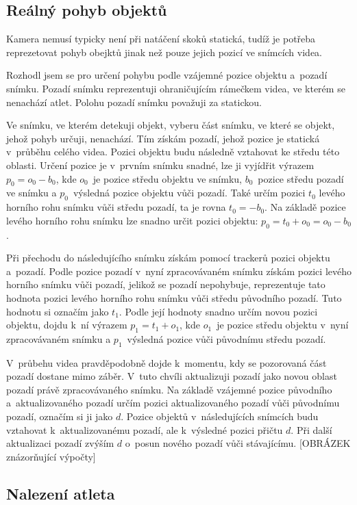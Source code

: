\subsection{Reálný pohyb objektů}

Kamera nemusí typicky není při natáčení skoků statická, tudíž je potřeba reprezetovat pohyb obejktů jinak než pouze jejich pozicí ve snímcích videa.

Rozhodl jsem se pro určení pohybu podle vzájemné pozice objektu a~pozadí snímku. Pozadí snímku reprezentuji ohraničujícím rámečkem videa, ve kterém se nenachází atlet. Polohu pozadí snímku považuji za statickou.

Ve snímku, ve kterém detekuji objekt, vyberu část snímku, ve které se objekt, jehož pohyb určuji, nenachází. Tím získám pozadí, jehož pozice je statická v~průběhu celého videa. Pozici objektu budu následně vztahovat ke středu této oblasti. Určení pozice je v~prvním snímku snadné, lze ji vyjídřit výrazem $p_0=o_0-b_0$, kde $o_0$~je pozice středu objektu ve snímku, $b_0$~pozice středu pozadí ve snímku a $p_0$~výsledná pozice objektu vůči pozadí. Také určím pozici $t_0$ levého horního rohu snímku vůči středu pozadí, ta je rovna $t_0=-b_0$. Na základě pozice levého horního rohu snímku lze snadno určit pozici objektu: $p_0=t_0+o_0=o_0-b_0$.

Při přechodu do následujícího snímku získám pomocí trackerů pozici objektu a~pozadí. Podle pozice pozadí v~nyní zpracovávaném snímku získám pozici levého horního snímku vůči pozadí, jelikož se pozadí nepohybuje, reprezentuje tato hodnota pozici levého horního rohu snímku vůči středu původního pozadí. Tuto hodnotu si označím jako $t_1$. Podle její hodnoty snadno určím novou pozici objektu, dojdu k~ní výrazem $p_1=t_1+o_1$, kde $o_1$~je pozice středu objektu v~nyní zpracovávaném snímku a $p_1$~výsledná pozice vůči původnímu středu pozadí.

V~průbehu videa pravděpodobně dojde k~momentu, kdy se pozorovaná část pozadí dostane mimo záběr. V~tuto chvíli aktualizuji pozadí jako novou oblast pozadí právě zpracovávaného snímku. Na základě vzájemné pozice původního a~aktualizovaného pozadí určím pozici aktualizovaného pozadí vůči původnímu pozadí, označím si ji jako $d$. Pozice objektů v~následujících snímcích budu vztahovat k~aktualizovanému pozadí, ale k~výsledné pozici přičtu $d$. Při další aktualizaci pozadí zvýším $d$ o~posun nového pozadí vůči stávajícímu. [OBRÁZEK znázorňující výpočty]

\subsection{Nalezení atleta}

